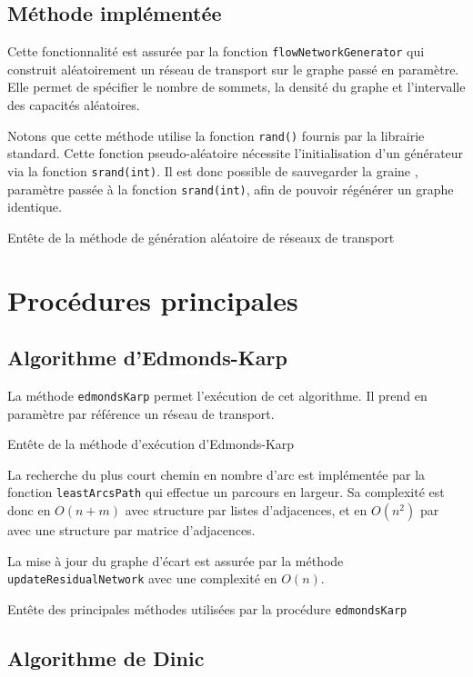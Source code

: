 \subsection{Méthode implémentée}
Cette fonctionnalité est assurée par la fonction \texttt{flowNetworkGenerator} qui construit aléatoirement un réseau de transport sur le graphe passé en paramètre. Elle permet de spécifier le nombre de sommets, la densité du graphe et l'intervalle des capacités aléatoires.

Notons que cette méthode utilise la fonction \texttt{rand()} fournis par la librairie standard. Cette fonction \og pseudo-aléatoire \fg nécessite l'initialisation d'un générateur via la fonction \texttt{srand(int)}. Il est donc possible de sauvegarder la \og graine \fg, paramètre passée à la fonction \texttt{srand(int)}, afin de pouvoir régénérer un graphe identique.

Entête de la méthode de génération aléatoire de réseaux de transport


\section{Procédures principales}

\subsection{Algorithme d'Edmonds-Karp}

La méthode \texttt{edmondsKarp} permet l'exécution de cet algorithme. Il prend en paramètre par référence un réseau de transport.

Entête de la méthode d'exécution d'Edmonds-Karp


La recherche du plus court chemin en nombre d'arc est implémentée par la fonction \texttt{leastArcsPath} qui effectue un parcours en largeur. Sa complexité est donc en $O(n+m)$ avec structure par listes d'adjacences, et en $O(n^2)$ par avec une structure par matrice d'adjacences.

La mise à jour du graphe d'écart est assurée par la méthode \texttt{updateResidualNetwork} avec une complexité en $O(n)$.

Entête des principales méthodes utilisées par la procédure \texttt{edmondsKarp}


\subsection{Algorithme de Dinic}

